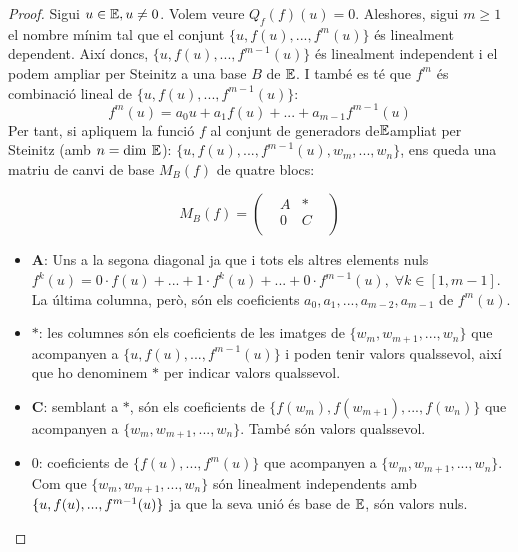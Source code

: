 \begin{proof}

Sigui $u \in \mathbb{E}, u \neq 0$. Volem veure $Q_f(f)(u) = 0$. Aleshores, sigui $m\geq 1$ el nombre mínim tal que el conjunt $\{u,f(u),...,f^m(u)\}$ és linealment dependent. Així doncs, $\{u,f(u),...,f^{m-1}(u)\}$ és linealment independent i el podem ampliar per Steinitz a una base $B$ de $\mathbb{E}$. I també es té que $f^m$ és combinació lineal de $\{u,f(u),...,f^{m-1}(u)\}$:
$$ f^m(u) = a_0u + a_1f(u) + ... + a_{m-1}f^{m-1}(u) $$
Per tant, si apliquem la funció $f$ al conjunt de generadors de$\mathbb{E}$ampliat per Steinitz (amb $n = \dim\:\mathbb{E}$): $\{u,f(u),...,f^{m-1}(u), w_{m},...,w_n\}$, ens queda una matriu de canvi de base $M_B(f)$ de quatre blocs:

\[ M_B(f) = 
\begin{pmatrix}
    &A &*  &\\
    &0  &C &\\
\end{pmatrix}
\]

\begin{itemize}
    \item \textbf{A}: Uns a la segona diagonal ja que i tots els altres elements nuls $f^k(u) = 0\cdot f(u) + ... + 1\cdot f^k(u) + ... + 0\cdot f^{m-1}(u), \; \forall k \in [1,m-1] $. La última columna, però, són els coeficients $a_0,a_1,...,a_{m-2},a_{m-1}$ de $f^m(u)$.
    
    \item $\mathbf{*}$: les columnes són els coeficients de les imatges de $\{w_{m}, w_{m+1}, ..., w_{n}\}$ que acompanyen a $\{u,f(u),...,f^{m-1}(u)\}$ i poden tenir valors qualssevol, així que ho denominem $\mathbf{*}$ per indicar valors qualssevol.
    
    \item \textbf{C}: semblant a $\mathbf{*}$, són els coeficients de $\{f(w_{m}), f(w_{m+1}), ..., f(w_{n})\}$ que acompanyen a $\{w_{m}, w_{m+1}, ..., w_{n}\}$. També són valors qualssevol.
    
    \item $0$: coeficients de $\{f(u),...,f^{m}(u)\}$ que acompanyen a $\{w_{m}, w_{m+1}, ..., w_{n}\}$. Com que $\{w_{m}, w_{m+1}, ..., w_{n}\}$ són linealment independents amb $\{u,f(u), ...,\\ f^{m-1}(u)\}$ ja que la seva unió és base de $\mathbb{E}$, són valors nuls.
\end{itemize}


\end{proof}
